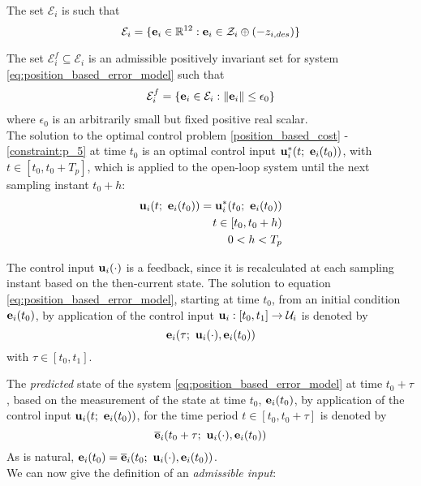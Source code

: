 The set $\mathcal{E}_i$ is such that
$$\mathcal{E}_i = \{\bm{\mathbf{e}}_i \in \mathbb{R}^{12} : \bm{\mathbf{e}}_i \in \mathcal{Z}_i \oplus (-z_{i,des} )\}$$

The set $\mathcal{E}_i^f \subseteq \mathcal{E}_i$ is an admissible positively
invariant set  for system \eqref{eq:position_based_error_model}
such that
\begin{align}
  \mathcal{E}_i^f = \{\bm{\mathbf{e}}_i \in \mathcal{E}_i : \|\bm{\mathbf{e}}_i\| \leq \epsilon_0 \}
\end{align}
where $\epsilon_0$ is an arbitrarily small but fixed positive real scalar.\\

The solution to the optimal control problem \eqref{position_based_cost} -
\eqref{constraint:p_5} at time $t_0$ is an optimal control input
$\bm{\mathbf{u}}_i^{\ast}(t;\ \bm{\mathbf{e}}_i(t_0))$, with $t \in [t_0, t_0 + T_p]$, which
is applied to the open-loop system until the next sampling instant $t_0 + h$:
\begin{align}
  \vect{u}_i(t;\ \vect{e}_i(t_0)) = \vect{u}_i^{\ast}(t_0;\ \vect{e}_i(t_0)) \\
  t \in [t_0, t_0 + h) \\
  0 < h < T_p
\end{align}

The control input $\bm{\mathbf{u}}_i(\cdot)$ is a feedback, since it is
recalculated at each sampling instant based on the then-current state. The
solution to equation \eqref{eq:position_based_error_model}, starting at time
$t_0$, from an initial condition $\bm{\mathbf{e}}_i(t_0)$, by application of the
control input $\bm{\mathbf{u}}_i : [t_0, t_1] \to \mathcal{U}_i$ is denoted by
$$\bm{\mathbf{e}}_i(\tau;\ \bm{\mathbf{u}}_i(\cdot), \bm{\mathbf{e}}_i(t_0))$$
with $\tau \in [t_0, t_1]$.

The \textit{predicted} state of the system \eqref{eq:position_based_error_model}
at time $t_0 + \tau$, based on the measurement of the state at time
$t_0$, $\bm{\mathbf{e}}_i(t_0)$, by application of the control input
$\vect{u}_i(t;\ \vect{e}_i(t_0))$, for the time period $t \in [t_0, t_0 + \tau]$
is denoted by
$$\overline{\bm{\mathbf{e}}}_i(t_0 + \tau;\ \bm{\mathbf{u}}_i(\cdot), \bm{\mathbf{e}}_i(t_0))$$
As is natural,
$\vect{e}_i(t_0) = \overline{\vect{e}}_i(t_0;\ \vect{u}_i(\cdot), \vect{e}_i(t_0))$.\\

We can now give the definition of an \textit{admissible input}:

